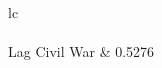 \renewcommand{\arraystretch}{0.5}
\begin{center}
\begin{table}{lc}
\\[-1.8ex]\hline
\hline \hline 
\\Lag Civil War & 0.5276
\end{table}
\end{center}